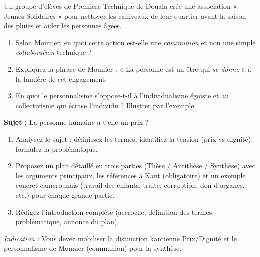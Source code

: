 \documentclass[11pt]{article}
\newcounter{popsec}
\newcounter{popsub}
\newcommand{\courssub}[1]{%
  \stepcounter{popsub}%
  \par\vspace{9pt}\noindent{\popxbold\fontsize{11.5}{13}\selectfont\color{popink}{\color{poporange}\thepopsec.\thepopsub}\hspace{6pt}#1}\par\nopagebreak\vspace{4pt}
}
\begin{document}
\begin{exercice}
Un groupe d'élèves de Première Technique de Douala crée une association « Jeunes Solidaires » pour nettoyer les caniveaux de leur quartier avant la saison des pluies et aider les personnes âgées.
\begin{enumerate}
    \item Selon Mounier, en quoi cette action est-elle une \emph{communion} et non une simple \emph{collaboration} technique ?
    \item Expliquez la phrase de Mounier : « La personne est un être qui \emph{se donne} » à la lumière de cet engagement.
    \item En quoi le personnalisme s'oppose-t-il à l'individualisme égoïste et au collectivisme qui écrase l'individu ? Illustrer par l'exemple.
\end{enumerate}
\end{exercice}

\courssub{Je me prépare au Bac}

\begin{exercice}
\textbf{Sujet :} \og La personne humaine a-t-elle un prix ? \fg
\begin{enumerate}
    \item Analysez le sujet : définissez les termes, identifiez la tension (prix vs dignité), formulez la problématique.
    \item Proposez un plan détaillé en trois parties (Thèse / Antithèse / Synthèse) avec les arguments principaux, les références à Kant (obligatoire) et un exemple concret camerounais (travail des enfants, traite, corruption, don d'organes, etc.) pour chaque grande partie.
    \item Rédigez l'introduction complète (accroche, définition des termes, problématique, annonce du plan).
\end{enumerate}
\textit{Indication :} Vous devez mobiliser la distinction kantienne Prix/Dignité et le personnalisme de Mounier (communion) pour la synthèse.
\end{exercice}
\end{document}
